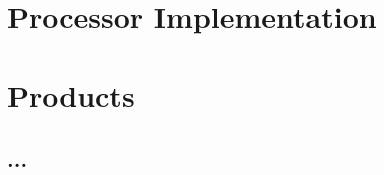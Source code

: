 \documentclass{article}
\begin{document}
\section{Processor Implementation}\label{sec-imple}

\pagebreak

\section{Products}\label{sec-prod}

\pagebreak

\begin{appendices}
\section{...}
\end{appendices}
\pagebreak

 

\end{document}
